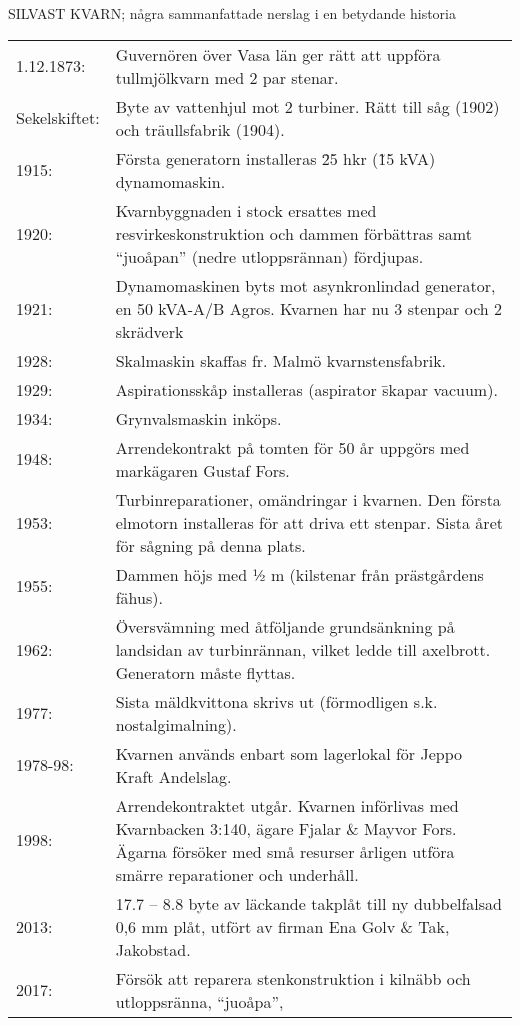 SILVAST KVARN; några sammanfattade nerslag i en betydande historia
\begin{center}
  \begin{tabular}{l p{}}
    \hline
    1.12.1873: &	Guvernören över Vasa län ger rätt att uppföra tullmjölkvarn med 2 par	stenar. \\
    Sekelskiftet: &	Byte av vattenhjul mot 2 turbiner. Rätt till såg (1902) och träullsfabrik (1904). \\
    1915: &	Första generatorn installeras \= 25 hkr (\~15 kVA) dynamomaskin. \\
    1920: &	Kvarnbyggnaden i stock ersattes med resvirkeskonstruktion och dammen förbättras samt ``juoåpan'' (nedre utloppsrännan) fördjupas. \\
    1921: & Dynamomaskinen byts mot asynkronlindad generator, en 50 kVA-A/B Agros. Kvarnen har nu 3 stenpar och 2 skrädverk \\
    1928: &	Skalmaskin skaffas fr. Malmö kvarnstensfabrik. \\
    1929: &	Aspirationsskåp installeras (aspirator \= skapar vacuum). \\
    1934: &	Grynvalsmaskin inköps. \\
    1948:	&	Arrendekontrakt på tomten för 50 år uppgörs med markägaren Gustaf Fors. \\
    1953: &	Turbinreparationer, omändringar i kvarnen. Den första elmotorn installeras för att driva ett stenpar. Sista året för sågning på denna plats. \\
    1955: &	Dammen höjs med ½ m (kilstenar från prästgårdens fähus). \\
    1962: &	Översvämning med åtföljande grundsänkning på landsidan av turbinrännan, vilket ledde till axelbrott. Generatorn måste flyttas. \\
    1977: &	Sista mäldkvittona skrivs ut (förmodligen s.k. nostalgimalning). \\
    1978-98: & Kvarnen används enbart som lagerlokal för Jeppo Kraft Andelslag. \\
    1998:	&	Arrendekontraktet utgår. Kvarnen införlivas med Kvarnbacken 3:140, ägare Fjalar \& Mayvor Fors. Ägarna försöker med små resurser årligen utföra smärre reparationer och underhåll. \\
    2013:	&	17.7 – 8.8 byte av läckande takplåt till ny dubbelfalsad 0,6 mm plåt, utfört av firman Ena Golv \& Tak, Jakobstad. \\
    2017: & Försök att reparera stenkonstruktion i kilnäbb och utloppsränna, ``juoåpa'', \\
    \hline
  \end{tabular}
\end{center}

